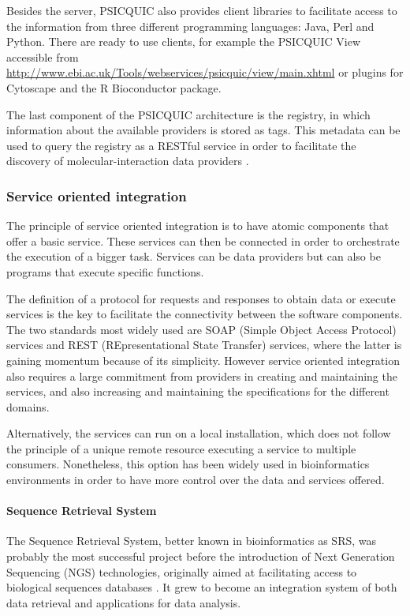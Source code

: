 Besides the server, PSICQUIC also provides client libraries to facilitate access to the information from three different programming languages: Java, Perl and Python. There are ready to use clients, for example the PSICQUIC View accessible from \url{http://www.ebi.ac.uk/Tools/webservices/psicquic/view/main.xhtml} or plugins for Cytoscape and the R Bioconductor package.

The last component of the PSICQUIC architecture is the registry, in which information about the available providers is stored as tags. This metadata can be used to query the registry as a RESTful service in order to facilitate the discovery of molecular-interaction data providers \cite{DEL2013}.


\subsubsection{Service oriented integration} 
The principle of service oriented integration is to have atomic components that offer a basic service. These services can then be connected in order to orchestrate the execution of a bigger task. Services can be data providers but can also be programs that execute specific functions.

The definition of a protocol for requests and responses to obtain data or execute services is the key to facilitate the connectivity between the software components. The two standards most widely used are SOAP (Simple Object Access Protocol) services and REST (REpresentational State Transfer) services, where the latter is gaining momentum because of its simplicity. However service oriented integration also requires a large commitment from providers in creating and maintaining the services, and also increasing and maintaining the specifications for the different domains.

Alternatively, the services can run on a local installation, which does not follow the principle of a unique remote resource executing a service to multiple consumers. Nonetheless, this option has been widely used in bioinformatics environments in order to have more control over the data and services offered.

\paragraph{Sequence Retrieval System}

The Sequence Retrieval System, better known in bioinformatics as SRS, was probably the most successful project before the introduction of Next Generation Sequencing (NGS) technologies, originally aimed at facilitating access to biological sequences databases \cite{ETZ1996}. It grew to become an integration system of both data retrieval and applications for data analysis.

